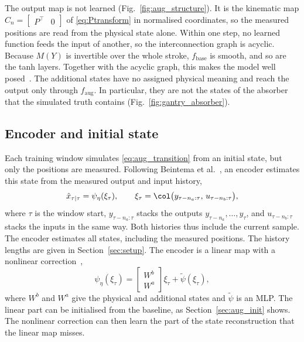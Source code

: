 The output map is not learned (Fig.~\ref{fig:aug_structure}).
It is the kinematic map $C_n=\begin{bmatrix}P^\top & 0\end{bmatrix}$ of
\eqref{eq:Ptransform} in normalised coordinates, so the measured positions
are read from the physical state alone.
Within one step, no learned function feeds the input of another, so the
interconnection graph is acyclic.
Because $M(Y)$ is invertible over the whole stroke, $f_{\mathrm{base}}$ is
smooth, and so are the tanh layers.
Together with the acyclic graph, this makes the model well
posed~\cite[Thm.~9]{hoekstra2026lfr}.
The additional states have no assigned physical meaning and reach the output
only through $f_{\mathrm{aug}}$.
In particular, they are not the states of the absorber that the simulated
truth contains (Fig.~\ref{fig:gantry_absorber}).

\subsection{Encoder and initial state}\label{sec:aug_encoder}
Each training window simulates \eqref{eq:aug_transition} from an initial
state, but only the positions are measured.
Following Beintema et al.~\cite{beintema2023subnet}, an encoder estimates
this state from the measured output and input history,
\begin{equation}
 \hat x_{\tau|\tau}
 =\psi_\eta(\xi_\tau),\qquad
 \xi_\tau=\col\bigl(y_{\tau-n_a:\tau},\,u_{\tau-n_b:\tau}\bigr),
 \label{eq:aug_encoder}
\end{equation}
where $\tau$ is the window start, $y_{\tau-n_a:\tau}$ stacks the outputs
$y_{\tau-n_a},\dots,y_\tau$, and $u_{\tau-n_b:\tau}$ stacks the inputs in the
same way.
Both histories thus include the current sample.
The encoder estimates all states, including the measured positions.
The history lengths are given in Section~\ref{sec:setup}.
The encoder is a linear map with a nonlinear
correction~\cite[Eq.~(8)]{hoekstra2026encoder},
\begin{equation}
 \psi_\eta(\xi_\tau)
 =\begin{bmatrix}W^b\\ W^a\end{bmatrix}\xi_\tau+\tilde\psi(\xi_\tau),
 \label{eq:aug_enc_lin}
\end{equation}
where $W^b$ and $W^a$ give the physical and additional states and
$\tilde\psi$ is an MLP.
The linear part can be initialised from the baseline, as
Section~\ref{sec:aug_init} shows.
The nonlinear correction can then learn the part of the state reconstruction
that the linear map misses.

